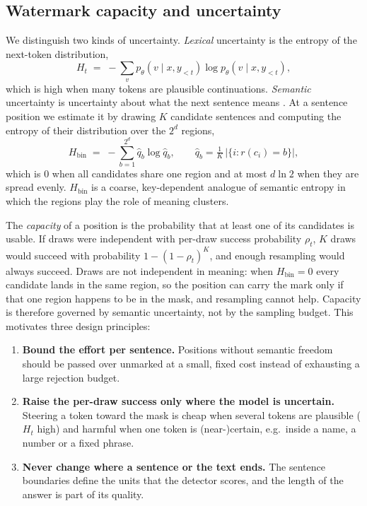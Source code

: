 \subsection{Watermark capacity and uncertainty}
\label{sec:capacity}

We distinguish two kinds of uncertainty. \emph{Lexical} uncertainty is the entropy of the next-token distribution,
\begin{equation}
  H_t \;=\; -\sum_{v} p_\theta(v \mid x, y_{<t}) \log p_\theta(v \mid x, y_{<t}) ,
  \label{eq:token-entropy}
\end{equation}
which is high when many tokens are plausible continuations. \emph{Semantic} uncertainty is uncertainty about what the
next sentence means \citep{kuhn2023semantic}. At a sentence position we estimate it by drawing $K$ candidate sentences and
computing the entropy of their distribution over the $2^d$ regions,
\begin{equation}
  H_{\text{bin}} \;=\; -\sum_{b=1}^{2^d} \hat q_b \log \hat q_b ,
  \qquad \hat q_b = \tfrac{1}{K}\,\big|\{ i : r(c_i) = b \}\big| ,
  \label{eq:bin-entropy}
\end{equation}
which is $0$ when all candidates share one region and at most $d \ln 2$ when they are spread evenly. $H_{\text{bin}}$ is
a coarse, key-dependent analogue of semantic entropy in which the regions play the role of meaning clusters.

The \emph{capacity} of a position is the probability that at least one of its candidates is usable. If draws were
independent with per-draw success probability $\rho_t$, $K$ draws would succeed with probability $1 - (1 - \rho_t)^K$,
and enough resampling would always succeed. Draws are not independent in meaning: when $H_{\text{bin}} = 0$ every
candidate lands in the same region, so the position can carry the mark only if that one region happens to be in the
mask, and resampling cannot help. Capacity is therefore governed by semantic uncertainty, not by the sampling budget.
This motivates three design principles:
\begin{enumerate}
  \item[(P1)] \textbf{Bound the effort per sentence.} Positions without semantic freedom should be passed over unmarked
  at a small, fixed cost instead of exhausting a large rejection budget.
  \item[(P2)] \textbf{Raise the per-draw success only where the model is uncertain.} Steering a token toward the mask is
  cheap when several tokens are plausible ($H_t$ high) and harmful when one token is (near-)certain, e.g.\ inside a
  name, a number or a fixed phrase.
  \item[(P3)] \textbf{Never change where a sentence or the text ends.} The sentence boundaries define the units that
  the detector scores, and the length of the answer is part of its quality.
\end{enumerate}

